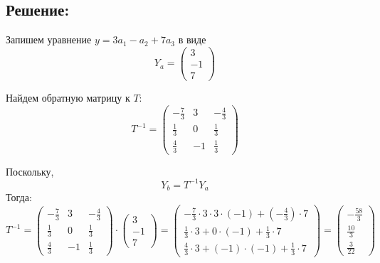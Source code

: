 \documentclass{article}
\begin{document}
        \subsection{Решение:}
        Запишем  уравнение $y = 3a_1 - a_2 + 7a_3$ в виде 
                \[
        Y_a = \left(
        \begin{array}{c}
        3 \\
        -1 \\
        7
        \end{array}
        \right)
        \]
        
        Найдем обратную матрицу к $T$:
        \[
        T^{-1} =
        \left(
        \begin{array}{ccc}
        -\frac{7}{3} & 3 & -\frac{4}{3} \\
        \frac{1}{3} & 0 & \frac{1}{3} \\
        \frac{4}{3} & -1 & \frac{1}{3}
        \end{array}
        \right)
        \]
        
        Поскольку, 
        \[
        Y_b = T^{-1} Y_a
        \]
        Тогда:
        \[
        T^{-1} =
        \left(
        \begin{array}{ccc}
        -\frac{7}{3} & 3 & -\frac{4}{3} \\
        \frac{1}{3} & 0 & \frac{1}{3} \\
        \frac{4}{3} & -1 & \frac{1}{3}
        \end{array}
        \right) \cdot \left(
        \begin{array}{c}
        3 \\
        -1 \\
        7
        \end{array}
        \right) = 
        \left(
        \begin{array}{ccc}
        -\frac{7}{3} \cdot 3 \cdot 3 \cdot (-1) + \left(-\frac{4}{3} \right)  \cdot 7\\
        \frac{1}{3} \cdot 3 + 0 \cdot (-1) + \frac{1}{3} \cdot 7 \\
        \frac{4}{3} \cdot 3 + (-1) \cdot (-1) + \frac{1}{3} \cdot 7
        \end{array}
        \right) = \left(
        \begin{array}{c}
        -\frac{58}{3} \\
        \frac{10}{3} \\
        \frac{3}{22}
        \end{array}
        \right)
        \]
        
\end{document}
